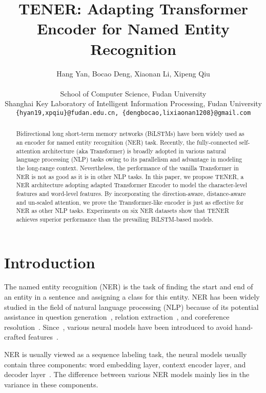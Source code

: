 \documentclass[11pt,a4paper]{article}
\title{TENER: Adapting Transformer Encoder for Named Entity Recognition}
\author{Hang Yan, Bocao Deng, Xiaonan Li, Xipeng Qiu \\\\
	School of Computer Science, Fudan University\\ Shanghai Key Laboratory of Intelligent Information Processing, Fudan University \\
	{\small \texttt{\{hyan19,xpqiu\}@fudan.edu.cn, \{dengbocao,lixiaonan1208\}@gmail.com} }
}
\date{}
\begin{document}
\maketitle

\renewcommand{\thefootnote}{\fnsymbol{footnote}}
\renewcommand{\thefootnote}{\arabic{footnote}}

\begin{abstract}
 Bidirectional long short-term memory networks (BiLSTMs) have been widely used as an encoder for named entity recognition (NER) task.  Recently, the fully-connected self-attention architecture (aka Transformer) is broadly adopted in various natural language processing (NLP) tasks owing to its parallelism and advantage in modeling the long-range context. Nevertheless, the performance of the vanilla Transformer in NER is not as good as it is in other NLP tasks. In this paper, we propose TENER, a NER architecture adopting adapted Transformer Encoder to model the character-level features and word-level features. By incorporating the direction-aware, distance-aware and un-scaled attention, we prove the Transformer-like encoder is just as effective for NER as other NLP tasks.
Experiments on six NER datasets show that TENER achieves superior performance than the prevailing BiLSTM-based models.
\end{abstract}

\section{Introduction}

The named entity recognition (NER) is the task of finding the start and end of an entity in a sentence and assigning a class for this entity. NER has been widely studied in the field of natural language processing (NLP) because of its potential assistance in question generation~\cite{DBLP:conf/nlpcc/ZhouYWTBZ17}, relation extraction~\cite{miwa2016end}, and coreference resolution~\cite{fragkou2017applying}. Since~\cite{collobert2011natural}, various neural models have been introduced to avoid hand-crafted features~\cite{huang2015bidirectional,ma2016end,lample2016neural}.

NER is usually viewed as a sequence labeling task, the neural models usually contain three components: word embedding layer, context encoder layer, and decoder layer~\cite{huang2015bidirectional,ma2016end,lample2016neural,DBLP:journals/tacl/ChiuN16,chen2019grn,DBLP:conf/acl/ZhangLS18,gui2019lexicon}. The difference between various NER models mainly lies in the variance in these components.
\end{document}
